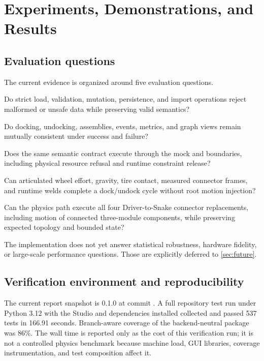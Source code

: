 \section{Experiments, Demonstrations, and Results}
\label{sec:experiments}

\subsection{Evaluation questions}

The current evidence is organized around five evaluation questions.

\begin{description}[style=nextline]
  \item[EQ1: Package correctness]
  Do strict load, validation, mutation, persistence, and import operations reject
  malformed or unsafe data while preserving valid semantics?

  \item[EQ2: Semantic runtime correctness]
  Do docking, undocking, assemblies, events, metrics, and graph views remain mutually
  consistent under success and failure?

  \item[EQ3: Backend realization]
  Does the same semantic contract execute through the mock and \mujoco{} boundaries,
  including physical resource refusal and runtime constraint release?

  \item[EQ4: Physical actuation]
  Can articulated wheel effort, gravity, tire contact, measured connector frames, and
  runtime welds complete a dock/undock cycle without root motion injection?

  \item[EQ5: Multi-module reconfiguration]
  Can the physics path execute all four Driver-to-Snake connector replacements,
  including motion of connected three-module components, while preserving expected
  topology and bounded state?
\end{description}

The implementation does not yet answer statistical robustness, hardware fidelity, or
large-scale performance questions. Those are explicitly deferred to
\cref{sec:future}.

\subsection{Verification environment and reproducibility}

The current report snapshot is \modsim{} 0.1.0 at commit . A full
repository test run under Python 3.12 with the Studio and \mujoco{} dependencies
installed collected and passed 537 tests in 166.91 seconds. Branch-aware coverage of
the backend-neutral  package was 86\%. The wall time is reported only as
the cost of this verification run; it is not a controlled physics benchmark because
machine load, GUI libraries, coverage instrumentation, and test composition affect it.

